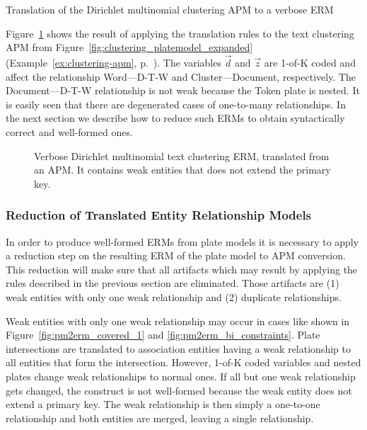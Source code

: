 \begin{Example} Translation of the Dirichlet multinomial clustering APM to a verbose ERM
\label{ex:clustering-erm-verbose}

Figure~\ref{fig:clustering_erm_good_verbose} shows the result of applying the translation rules to the text clustering APM from Figure~\ref{fig:clustering_platemodel_expanded} (Example~\ref{ex:clustering-apm}, p.~\pageref{ex:clustering-apm}). The variables $\vec d$ and $\vec z$ are 1-of-K coded and affect the relationship Word---D-T-W and Cluster---Document, respectively. The Document---D-T-W relationship is not weak because the Token plate is nested. It is easily seen that there are degenerated cases of one-to-many relationships. In the next section we describe how to reduce such ERMs to obtain syntactically correct and well-formed ones.

\end{Example}

\begin{figure}[h]
\centering
\scalebox{\tikzScale}{\adjustTikzSize }
\caption[Verbose Dirichlet multinomial text clustering ERM]{Verbose Dirichlet multinomial text clustering ERM, translated from an APM. It contains weak entities that does not extend the primary key.}\label{fig:clustering_erm_good_verbose}
\end{figure}

\subsubsection{Reduction of Translated Entity Relationship Models}
\label{sec:erm_reduction}

In order to produce well-formed ERMs from plate models it is necessary to apply a reduction step on the resulting ERM of the plate model to APM conversion. This reduction will make sure that all artifacts which may result by applying the rules described in the previous section are eliminated. Those artifacts are (1) weak entities with only one weak relationship and (2) duplicate relationships.

Weak entities with only one weak relationship may occur in cases like shown in Figure~\ref{fig:pm2erm_covered_1} and \ref{fig:pm2erm_bi_constraints}. Plate intersections are translated to association entities having a weak relationship to all entities that form the intersection. However, 1-of-K coded variables and nested plates change weak relationships to normal ones. If all but one weak relationship gets changed, the construct is not well-formed because the weak entity does not extend a primary key. The weak relationship is then simply a one-to-one relationship and both entities are merged, leaving a single relationship.

